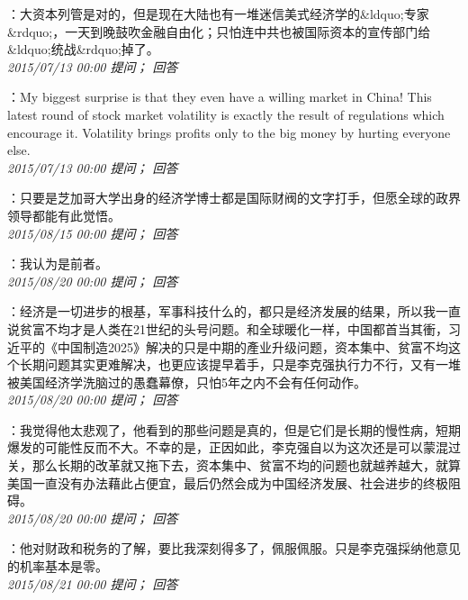 \documentclass[twocolumn]{ctexart}
\begin{document}
：大资本列管是对的，但是现在大陆也有一堆迷信美式经济学的\&ldquo;专家\&rdquo;，一天到晚鼓吹金融自由化；只怕连中共也被国际资本的宣传部门给\&ldquo;统战\&rdquo;掉了。\\

\textit{\hfill\noindent\small 2015/07/13 00:00 提问； 回答}

：My biggest surprise is that they even have a willing market in China! This latest round of stock market volatility is exactly the result of regulations which encourage it. Volatility brings profits only to the big money by hurting everyone else.\\

\textit{\hfill\noindent\small 2015/07/13 00:00 提问； 回答}

：只要是芝加哥大学出身的经济学博士都是国际财阀的文字打手，但愿全球的政界领导都能有此觉悟。\\

\textit{\hfill\noindent\small 2015/08/15 00:00 提问； 回答}

：我认为是前者。\\

\textit{\hfill\noindent\small 2015/08/20 00:00 提问； 回答}

：经济是一切进步的根基，军事科技什么的，都只是经济发展的结果，所以我一直说贫富不均才是人类在21世纪的头号问题。和全球暖化一样，中国都首当其衝，习近平的《中国制造2025》解决的只是中期的產业升级问题，资本集中、贫富不均这个长期问题其实更难解决，也更应该提早着手，只是李克强执行力不行，又有一堆被美国经济学洗脑过的愚蠢幕僚，只怕5年之内不会有任何动作。\\

\textit{\hfill\noindent\small 2015/08/20 00:00 提问； 回答}

：我觉得他太悲观了，他看到的那些问题是真的，但是它们是长期的慢性病，短期爆发的可能性反而不大。不幸的是，正因如此，李克强自以为这次还是可以蒙混过关，那么长期的改革就又拖下去，资本集中、贫富不均的问题也就越养越大，就算美国一直没有办法藉此占便宜，最后仍然会成为中国经济发展、社会进步的终极阻碍。\\

\textit{\hfill\noindent\small 2015/08/20 00:00 提问； 回答}

：他对财政和税务的了解，要比我深刻得多了，佩服佩服。只是李克强採纳他意见的机率基本是零。\\

\textit{\hfill\noindent\small 2015/08/21 00:00 提问； 回答}
\end{document}
